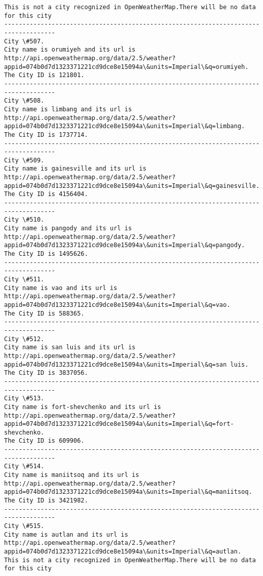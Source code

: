\documentclass[11pt]{article}
\begin{document}
\begin{Verbatim}[commandchars=\\\{\}]
This is not a city recognized in OpenWeatherMap.There will be no data for this city
------------------------------------------------------------------------------------
City \#507.
City name is orumiyeh and its url is http://api.openweathermap.org/data/2.5/weather?appid=074b0d7d1323371221cd9dce8e15094a\&units=Imperial\&q=orumiyeh.
The City ID is 121801.
------------------------------------------------------------------------------------
City \#508.
City name is limbang and its url is http://api.openweathermap.org/data/2.5/weather?appid=074b0d7d1323371221cd9dce8e15094a\&units=Imperial\&q=limbang.
The City ID is 1737714.
------------------------------------------------------------------------------------
City \#509.
City name is gainesville and its url is http://api.openweathermap.org/data/2.5/weather?appid=074b0d7d1323371221cd9dce8e15094a\&units=Imperial\&q=gainesville.
The City ID is 4156404.
------------------------------------------------------------------------------------
City \#510.
City name is pangody and its url is http://api.openweathermap.org/data/2.5/weather?appid=074b0d7d1323371221cd9dce8e15094a\&units=Imperial\&q=pangody.
The City ID is 1495626.
------------------------------------------------------------------------------------
City \#511.
City name is vao and its url is http://api.openweathermap.org/data/2.5/weather?appid=074b0d7d1323371221cd9dce8e15094a\&units=Imperial\&q=vao.
The City ID is 588365.
------------------------------------------------------------------------------------
City \#512.
City name is san luis and its url is http://api.openweathermap.org/data/2.5/weather?appid=074b0d7d1323371221cd9dce8e15094a\&units=Imperial\&q=san luis.
The City ID is 3837056.
------------------------------------------------------------------------------------
City \#513.
City name is fort-shevchenko and its url is http://api.openweathermap.org/data/2.5/weather?appid=074b0d7d1323371221cd9dce8e15094a\&units=Imperial\&q=fort-shevchenko.
The City ID is 609906.
------------------------------------------------------------------------------------
City \#514.
City name is maniitsoq and its url is http://api.openweathermap.org/data/2.5/weather?appid=074b0d7d1323371221cd9dce8e15094a\&units=Imperial\&q=maniitsoq.
The City ID is 3421982.
------------------------------------------------------------------------------------
City \#515.
City name is autlan and its url is http://api.openweathermap.org/data/2.5/weather?appid=074b0d7d1323371221cd9dce8e15094a\&units=Imperial\&q=autlan.
This is not a city recognized in OpenWeatherMap.There will be no data for this city

\end{Verbatim}
\end{document}
